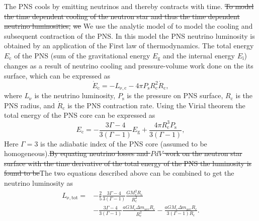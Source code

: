 \documentclass[fleqn,usenatbib]{mnras}
\newcommand{\NY}[2]{{\color{blue}\sout{#1}#2}}
\begin{document}
\NY{}{The PNS cools by emitting neutrinos and thereby contracts with time.} \NY{To model the time dependent cooling of the neutron star and thus the time dependent neutrino luminosities,}{} \NY{we}{ We} use the analytic model of \cite{Ugliano2012} \NY{}{to model the cooling and subsequent contraction of the PNS. In this model the PNS neutrino luminosity is obtained by an application of the First law of thermodynamics.} \NY{}{The total energy $E_{\text{c}}$ of the PNS (sum of the gravitational energy $E_{\text{g}}$ and the internal energy $E_{\text{i}}$) changes as a result of neutrino cooling and pressure-volume work done on the its surface, which can be expressed as 
\begin{equation}
    \dot{E}_{\text{c}} = - L_{\mathrm{\nu,c}} - 4\pi P_{\text{s}}R_{\text{c}}^2\dot{R}_{\text{c}},
\end{equation}
where $L_{\mathrm{\nu}}$ is the neutrino luminosity, $P_{\text{s}}$ is the pressure on PNS surface, $R_{\text{c}}$ is the PNS radius, and  $\dot{R}_{\text{c}}$ is the PNS contraction rate. Using the Virial theorem the total energy of the PNS core can be expressed as
\begin{equation}
    E_{\text{c}}= -\frac{3\Gamma -4}{3(\Gamma -1)}E_{\text{g}} + 
    \frac{4\pi R_{\text{c}}^3 P_{\text{s}}}{3(\Gamma -1)},
\end{equation}
Here $\Gamma = 3$ is the adiabatic index of the PNS core (assumed to be homogeneous).}\NY{By equating  neutrino losses and $PdV$ work on the neutron star surface with the time derivative of the total energy of the PNS the luminosity is found  to be}{The two equations described above can be combined to get the neutrino luminosity as}
\begin{equation}
\begin{split}
\label{eqn:lib}
    L_{\mathrm{\nu,tot}} = & - \frac{2}{5} \frac{3\Gamma - 4}{3(\Gamma - 1)} \frac{GM^2_{\mathrm{c}} R_{\mathrm{c}}}{R_{\mathrm{c}}^2} \\
            &  - \frac{3\Gamma - 4} {3(\Gamma - 1)} \frac{aGM_{\mathrm{c}}\Delta m_{\mathrm{acc}}R_\mathrm{c}}{R^2_{\mathrm{c}}}  -\frac{aGM_{\mathrm{c}}\Delta m_{\mathrm{acc}}R_{\mathrm{c}}}{3(\Gamma - 1)R_{\mathrm{c}}}.
\end{split}
\end{equation}
\end{document}
